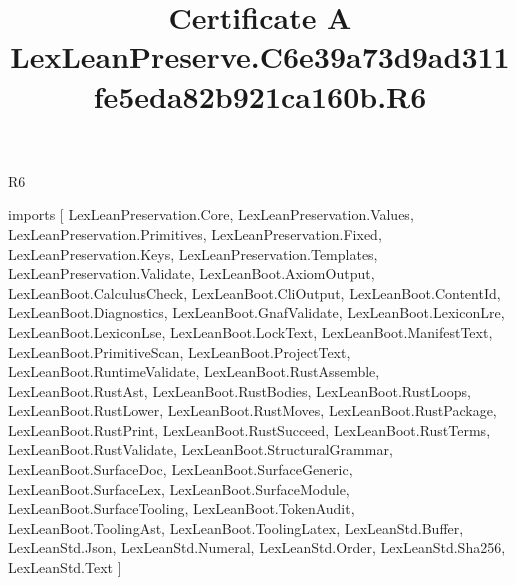 \begin{lexlean}{R6}
\title{Certificate A LexLeanPreserve.C6e39a73d9ad311fe5eda82b921ca160b.R6}
\begin{coremodule}
imports [
  LexLeanPreservation.Core,
  LexLeanPreservation.Values,
  LexLeanPreservation.Primitives,
  LexLeanPreservation.Fixed,
  LexLeanPreservation.Keys,
  LexLeanPreservation.Templates,
  LexLeanPreservation.Validate,
  LexLeanBoot.AxiomOutput,
  LexLeanBoot.CalculusCheck,
  LexLeanBoot.CliOutput,
  LexLeanBoot.ContentId,
  LexLeanBoot.Diagnostics,
  LexLeanBoot.GnafValidate,
  LexLeanBoot.LexiconLre,
  LexLeanBoot.LexiconLse,
  LexLeanBoot.LockText,
  LexLeanBoot.ManifestText,
  LexLeanBoot.PrimitiveScan,
  LexLeanBoot.ProjectText,
  LexLeanBoot.RuntimeValidate,
  LexLeanBoot.RustAssemble,
  LexLeanBoot.RustAst,
  LexLeanBoot.RustBodies,
  LexLeanBoot.RustLoops,
  LexLeanBoot.RustLower,
  LexLeanBoot.RustMoves,
  LexLeanBoot.RustPackage,
  LexLeanBoot.RustPrint,
  LexLeanBoot.RustSucceed,
  LexLeanBoot.RustTerms,
  LexLeanBoot.RustValidate,
  LexLeanBoot.StructuralGrammar,
  LexLeanBoot.SurfaceDoc,
  LexLeanBoot.SurfaceGeneric,
  LexLeanBoot.SurfaceLex,
  LexLeanBoot.SurfaceModule,
  LexLeanBoot.SurfaceTooling,
  LexLeanBoot.TokenAudit,
  LexLeanBoot.ToolingAst,
  LexLeanBoot.ToolingLatex,
  LexLeanStd.Buffer,
  LexLeanStd.Json,
  LexLeanStd.Numeral,
  LexLeanStd.Order,
  LexLeanStd.Sha256,
  LexLeanStd.Text
]


\end{coremodule}
\end{lexlean}
